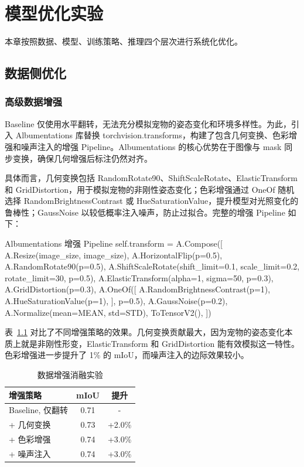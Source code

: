 \chapter{模型优化实验}
\label{chap:optimization}

本章按照数据、模型、训练策略、推理四个层次进行系统化优化。

\section{数据侧优化}

\subsection{高级数据增强}

Baseline 仅使用水平翻转，无法充分模拟宠物的姿态变化和环境多样性。为此，引入 Albumentations 库替换 torchvision.transforms，构建了包含几何变换、色彩增强和噪声注入的增强 Pipeline。Albumentations 的核心优势在于图像与 mask 同步变换，确保几何增强后标注仍然对齐。

具体而言，几何变换包括 RandomRotate90、ShiftScaleRotate、ElasticTransform 和 GridDistortion，用于模拟宠物的非刚性姿态变化；色彩增强通过 OneOf 随机选择 RandomBrightnessContrast 或 HueSaturationValue，提升模型对光照变化的鲁棒性；GaussNoise 以较低概率注入噪声，防止过拟合。完整的增强 Pipeline 如下：

\begin{codeblock}{Albumentations 增强 Pipeline}
self.transform = A.Compose([
    A.Resize(image_size, image_size),
    A.HorizontalFlip(p=0.5),
    A.RandomRotate90(p=0.5),
    A.ShiftScaleRotate(shift_limit=0.1, scale_limit=0.2,
                       rotate_limit=30, p=0.5),
    A.ElasticTransform(alpha=1, sigma=50, p=0.3),
    A.GridDistortion(p=0.3),
    A.OneOf([
        A.RandomBrightnessContrast(p=1),
        A.HueSaturationValue(p=1),
    ], p=0.5),
    A.GaussNoise(p=0.2),
    A.Normalize(mean=MEAN, std=STD),
    ToTensorV2(),
])
\end{codeblock}

表~\ref{tab:augmentation_results} 对比了不同增强策略的效果。几何变换贡献最大，因为宠物的姿态变化本质上就是非刚性形变，ElasticTransform 和 GridDistortion 能有效模拟这一特性。色彩增强进一步提升了 1\% 的 mIoU，而噪声注入的边际效果较小。

\begin{table}[H]
    \centering
    \caption{数据增强消融实验}
    \label{tab:augmentation_results}
    \begin{tabularx}{\textwidth}{Xcc}
        \hline
        \textbf{增强策略} & \textbf{mIoU} & \textbf{提升} \\
        \hline
        Baseline, 仅翻转 & 0.71 & - \\
        + 几何变换 & 0.73 & +2.0\% \\
        + 色彩增强 & 0.74 & +3.0\% \\
        + 噪声注入 & 0.74 & +3.0\% \\
        \hline
    \end{tabularx}
\end{table}

